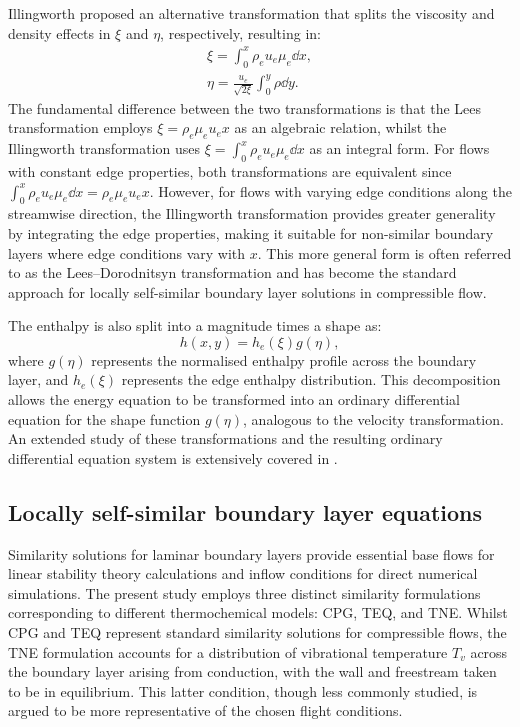 Illingworth \citep{White2005} proposed an alternative transformation that splits the viscosity and density effects in $\xi$ and $\eta$, respectively, resulting in:
\begin{gather}
    \xi = \int_{0}^{x} \rho_e u_e \mu_e \dd x, \\
    \eta = \frac{u_e}{\sqrt{2\xi}} \int_{0}^{y} \rho \dd y.
\end{gather}
The fundamental difference between the two transformations is that the Lees transformation employs $\xi = \rho_e \mu_e u_e x$ as an algebraic relation, whilst the Illingworth transformation uses $\xi = \int_{0}^{x} \rho_e u_e \mu_e \dd x$ as an integral form. For flows with constant edge properties, both transformations are equivalent since $\int_{0}^{x} \rho_e u_e \mu_e \dd x = \rho_e \mu_e u_e x$. However, for flows with varying edge conditions along the streamwise direction, the Illingworth transformation provides greater generality by integrating the edge properties, making it suitable for non-similar boundary layers where edge conditions vary with $x$. This more general form is often referred to as the Lees--Dorodnitsyn transformation and has become the standard approach for locally self-similar boundary layer solutions in compressible flow.

The enthalpy is also split into a magnitude times a shape as:
\begin{equation}
    h(x,y) = h_e(\xi) g(\eta),
\end{equation}
where $g(\eta)$ represents the normalised enthalpy profile across the boundary layer, and $h_e(\xi)$ represents the edge enthalpy distribution. This decomposition allows the energy equation to be transformed into an ordinary differential equation for the shape function $g(\eta)$, analogous to the velocity transformation. An extended study of these transformations and the resulting ordinary differential equation system is extensively covered in \citet[Section~6.5]{Anderson2019}.


\subsection{Locally self-similar boundary layer equations}\label{section:locallysimilar}

Similarity solutions for laminar boundary layers provide essential base flows for linear stability theory calculations and inflow conditions for direct numerical simulations. The present study employs three distinct similarity formulations corresponding to different thermochemical models: \gls{CPG}, \gls{TEQ}, and \gls{TNE}. Whilst \gls{CPG} and \gls{TEQ} represent standard similarity solutions for compressible flows, the \gls{TNE} formulation accounts for a distribution of vibrational temperature $T_v$ across the boundary layer arising from conduction, with the wall and freestream taken to be in equilibrium. This latter condition, though less commonly studied, is argued to be more representative of the chosen flight conditions.

